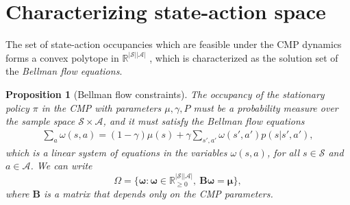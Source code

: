 \documentclass{article}
\theoremstyle{plain}
\newtheorem{proposition}[theorem]{Proposition}
\theoremstyle{definition}
\theoremstyle{remark}
\newcommand{\sS}{\mathcal{S}}
\newcommand{\sA}{\mathcal{A}}
\begin{document}
\section{Characterizing state-action space}\label{occupancy-space}
The set of state-action occupancies which are feasible under the CMP dynamics forms a convex polytope in $\mathbb{R}^{|\mathcal{S}||\mathcal{A}|}$ \citep{kallenberg1994survey}, which is characterized as the solution set of the \emph{Bellman flow equations}.

\begin{proposition}[Bellman flow constraints]\label{thm:bellman-flow}
The occupancy of the stationary policy $\pi$ in the CMP with parameters $\mu,\gamma,P$ must be a probability measure over the sample space $\sS\times\sA$, and it must satisfy the Bellman flow equations
\begin{align*}
    \sum_a\omega(s,a) = (1-\gamma) \mu(s) +
    \gamma \sum_{s', a'}\omega(s', a')p(s|s',a'),
\end{align*}
which is a linear system of equations in the variables $\omega(s,a)$, for all $s\in\mathcal{S}$ and $a\in\mathcal{A}$. 
We can write
\begin{equation}\label{eq:bellman-flow}
    \Omega = \{\boldsymbol{\omega}: \boldsymbol{\omega} \in \mathbb{R}^{|\sS||\sA|}_{\geq 0},\ \boldsymbol{B}\boldsymbol{\omega} = \boldsymbol{\mu}\},
\end{equation}
where $\boldsymbol{B}$ is a matrix that depends only on the CMP parameters.
\end{proposition}
\end{document}
